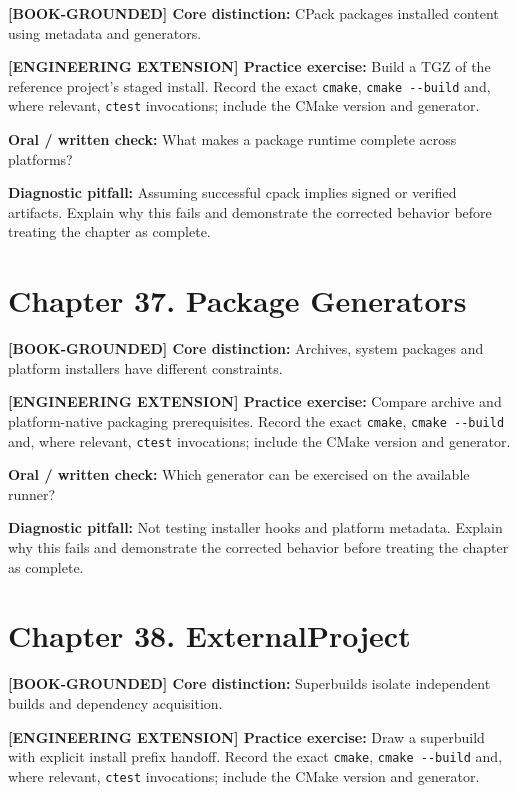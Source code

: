 \documentclass[11pt,letterpaper,oneside]{report}
\providecommand{\passthrough}[1]{#1}
\begin{document}
\textbf{{[}BOOK-GROUNDED{]} Core distinction:} CPack packages installed
content using metadata and generators.

\textbf{{[}ENGINEERING EXTENSION{]} Practice exercise:} Build a TGZ of
the reference project's staged install. Record the exact
\passthrough{\lstinline!cmake!}, \passthrough{\lstinline!cmake --build!}
and, where relevant, \passthrough{\lstinline!ctest!} invocations;
include the CMake version and generator.

\textbf{Oral / written check:} What makes a package runtime complete
across platforms?

\textbf{Diagnostic pitfall:} Assuming successful cpack implies signed or
verified artifacts. Explain why this fails and demonstrate the corrected
behavior before treating the chapter as complete.

\section{Chapter 37. Package
Generators}\label{chapter-37.-package-generators}

\textbf{{[}BOOK-GROUNDED{]} Core distinction:} Archives, system packages
and platform installers have different constraints.

\textbf{{[}ENGINEERING EXTENSION{]} Practice exercise:} Compare archive
and platform-native packaging prerequisites. Record the exact
\passthrough{\lstinline!cmake!}, \passthrough{\lstinline!cmake --build!}
and, where relevant, \passthrough{\lstinline!ctest!} invocations;
include the CMake version and generator.

\textbf{Oral / written check:} Which generator can be exercised on the
available runner?

\textbf{Diagnostic pitfall:} Not testing installer hooks and platform
metadata. Explain why this fails and demonstrate the corrected behavior
before treating the chapter as complete.

\section{Chapter 38. ExternalProject}\label{chapter-38.-externalproject}

\textbf{{[}BOOK-GROUNDED{]} Core distinction:} Superbuilds isolate
independent builds and dependency acquisition.

\textbf{{[}ENGINEERING EXTENSION{]} Practice exercise:} Draw a
superbuild with explicit install prefix handoff. Record the exact
\passthrough{\lstinline!cmake!}, \passthrough{\lstinline!cmake --build!}
and, where relevant, \passthrough{\lstinline!ctest!} invocations;
include the CMake version and generator.
\end{document}
